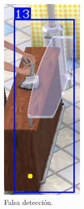 \begin{figure}[!htpb]
     \centering
     \begin{subfigure}[b]{0.3\textwidth}
         \centering
         \includegraphics[width=.65\textwidth]{./Figures/fallasDetector1.png}
         \caption{Falsa detección.}
         \label{fig:fallasDetector1de3}
     \end{subfigure}
     \hfill
     \begin{subfigure}[b]{0.3\textwidth}
         \centering

\end{subfigure}
\end{figure}

